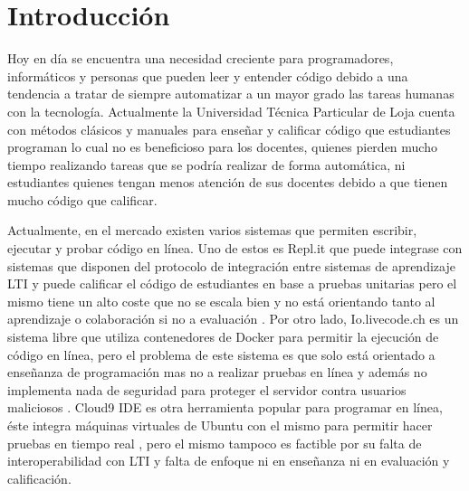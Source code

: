 
\chapter{Introducción}
\label{capitulo1}

%


\newcommand{\keyword}[1]{\textbf{#1}}
\newcommand{\tabhead}[1]{\textbf{#1}}
\newcommand{\code}[1]{\texttt{#1}}
\newcommand{\file}[1]{\texttt{\bfseries#1}}
\newcommand{\option}[1]{\texttt{\itshape#1}}


Hoy en día se encuentra una necesidad creciente para programadores, informáticos y personas que pueden leer y entender código debido a una tendencia a tratar de siempre automatizar a un mayor grado las tareas humanas con la tecnología. Actualmente la Universidad Técnica Particular de Loja cuenta con métodos clásicos y manuales para enseñar y calificar código que estudiantes programan lo cual no es beneficioso para los docentes, quienes pierden mucho tiempo realizando tareas que se podría realizar de forma automática, ni estudiantes quienes tengan menos atención de sus docentes debido a que tienen mucho código que calificar.
 
Actualmente, en el mercado existen varios sistemas que permiten escribir, ejecutar y probar código en línea. Uno de estos es Repl.it que puede integrase con sistemas que disponen del protocolo de integración entre sistemas de aprendizaje LTI  \citep{Repl.it-Home} y puede calificar el código de estudiantes en base a pruebas unitarias pero el mismo tiene un alto coste que no se escala bien y no está orientando tanto al aprendizaje o colaboración si no a evaluación \citep{Lopez-Jorge}. Por otro lado, Io.livecode.ch es un sistema libre que utiliza contenedores de Docker para permitir la ejecución de código en línea, pero el problema de este sistema es que solo está orientado a enseñanza de programación mas no a realizar pruebas en línea y además no implementa nada de seguridad para proteger el servidor contra usuarios maliciosos \citep{io.livecode.ch}. Cloud9 IDE es otra herramienta popular para programar en línea, éste integra máquinas virtuales de Ubuntu con el mismo para permitir hacer pruebas en tiempo real \citep{Cloud9-Home}, pero el mismo tampoco es factible por su falta de interoperabilidad con LTI  y falta de enfoque ni en enseñanza ni en evaluación y calificación. 

